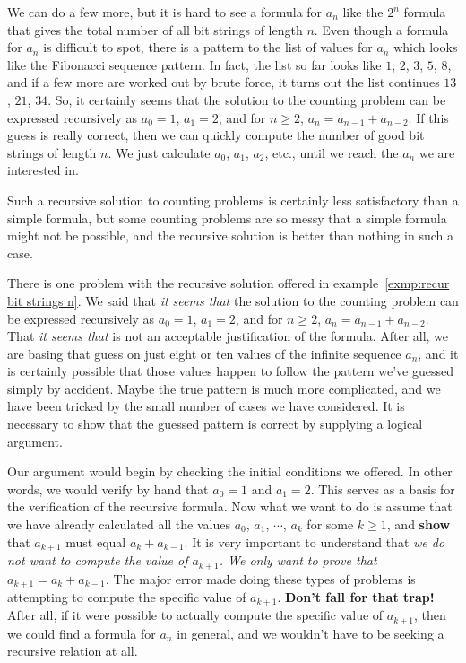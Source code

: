 \begin{exmp}
 
 We can do a few more, but it is hard to see a formula for $a_n$ like the $2^n$
 formula that gives the total number of all bit strings of length $n$. Even though
 a formula for $a_n$ is difficult to spot, there is a pattern to the list of
 values for $a_n$ which looks like the Fibonacci sequence pattern. In fact, the
 list so far looks like $1$, $2$, $3$, $5$, $8$, and if a few more are worked out
 by brute force, it turns out the list continues $13$, $21$, $34$. So, it certainly
 seems that the solution to the counting problem can be expressed recursively as
 $a_0=1$, $a_1=2$, and for $n\geq2$, $a_n=a_{n-1}+a_{n-2}$. If this guess is really
 correct, then we can quickly compute the number of good bit strings of length
 $n$. We just calculate $a_0$, $a_1$, $a_2$, etc., until we reach the $a_n$ we are
 interested in. 
\end{exmp} 


Such a recursive solution to counting problems is certainly less
satisfactory than a simple formula, but some counting problems are so messy that a
simple formula might not be possible, and the recursive solution is better than
nothing in such a case.

There is one problem with the recursive solution offered in 
example~\ref{exmp:recur bit strings n}. We said that
{\itshape it seems that} the solution to the counting problem can be expressed
recursively as 
$a_0=1$, $a_1=2$, and for $n\geq2$, $a_n=a_{n-1}+a_{n-2}$. That {\itshape it seems
that} is not an acceptable justification of the formula. After all, we are basing
that guess on just eight or ten values of the infinite sequence $a_n$, and it
is certainly possible that those values happen to follow the pattern we've guessed
simply by accident. Maybe the true pattern is much more complicated, and we have
been tricked by the small number of cases we have considered. It is necessary to
show that the guessed pattern is correct by supplying a logical argument.

Our argument would begin by checking the initial conditions we offered. In
other words, we would verify by hand that $a_0=1$ and $a_1=2$. This serves as a
basis for the verification of the recursive formula. Now what we want to do is
assume that we have already calculated all the values $a_0$, $a_1$, $\cdots$,
$a_k$ for some $k\geq1$, and {\bfseries show} that $a_{k+1}$ must equal $a_k+a_{k-1}$.
It is very important to understand that {\itshape we do not want to compute the value
of $a_{k+1}$. We only want to prove that $a_{k+1} = a_k+a_{k-1}$.} The major error
made doing these types of problems is attempting to compute the specific value of
$a_{k+1}$. {\bfseries Don't fall for that trap!} After all, if it were possible to
actually compute the specific value of $a_{k+1}$, then we could find a formula for
$a_n$ in general, and we wouldn't have to be seeking a recursive relation at all.

